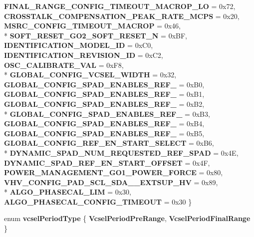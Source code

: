 \begin{DoxyCompactItemize}
{\bfseries F\+I\+N\+A\+L\+\_\+\+R\+A\+N\+G\+E\+\_\+\+C\+O\+N\+F\+I\+G\+\_\+\+T\+I\+M\+E\+O\+U\+T\+\_\+\+M\+A\+C\+R\+O\+P\+\_\+\+LO} = 0x72, 
{\bfseries C\+R\+O\+S\+S\+T\+A\+L\+K\+\_\+\+C\+O\+M\+P\+E\+N\+S\+A\+T\+I\+O\+N\+\_\+\+P\+E\+A\+K\+\_\+\+R\+A\+T\+E\+\_\+\+M\+C\+PS} = 0x20, 
{\bfseries M\+S\+R\+C\+\_\+\+C\+O\+N\+F\+I\+G\+\_\+\+T\+I\+M\+E\+O\+U\+T\+\_\+\+M\+A\+C\+R\+OP} = 0x46, 
\\*
{\bfseries S\+O\+F\+T\+\_\+\+R\+E\+S\+E\+T\+\_\+\+G\+O2\+\_\+\+S\+O\+F\+T\+\_\+\+R\+E\+S\+E\+T\+\_\+N} = 0x\+BF, 
{\bfseries I\+D\+E\+N\+T\+I\+F\+I\+C\+A\+T\+I\+O\+N\+\_\+\+M\+O\+D\+E\+L\+\_\+\+ID} = 0x\+C0, 
{\bfseries I\+D\+E\+N\+T\+I\+F\+I\+C\+A\+T\+I\+O\+N\+\_\+\+R\+E\+V\+I\+S\+I\+O\+N\+\_\+\+ID} = 0x\+C2, 
{\bfseries O\+S\+C\+\_\+\+C\+A\+L\+I\+B\+R\+A\+T\+E\+\_\+\+V\+AL} = 0x\+F8, 
\\*
{\bfseries G\+L\+O\+B\+A\+L\+\_\+\+C\+O\+N\+F\+I\+G\+\_\+\+V\+C\+S\+E\+L\+\_\+\+W\+I\+D\+TH} = 0x32, 
{\bfseries G\+L\+O\+B\+A\+L\+\_\+\+C\+O\+N\+F\+I\+G\+\_\+\+S\+P\+A\+D\+\_\+\+E\+N\+A\+B\+L\+E\+S\+\_\+\+R\+E\+F\+\_} = 0x\+B0, 
{\bfseries G\+L\+O\+B\+A\+L\+\_\+\+C\+O\+N\+F\+I\+G\+\_\+\+S\+P\+A\+D\+\_\+\+E\+N\+A\+B\+L\+E\+S\+\_\+\+R\+E\+F\+\_} = 0x\+B1, 
{\bfseries G\+L\+O\+B\+A\+L\+\_\+\+C\+O\+N\+F\+I\+G\+\_\+\+S\+P\+A\+D\+\_\+\+E\+N\+A\+B\+L\+E\+S\+\_\+\+R\+E\+F\+\_} = 0x\+B2, 
\\*
{\bfseries G\+L\+O\+B\+A\+L\+\_\+\+C\+O\+N\+F\+I\+G\+\_\+\+S\+P\+A\+D\+\_\+\+E\+N\+A\+B\+L\+E\+S\+\_\+\+R\+E\+F\+\_} = 0x\+B3, 
{\bfseries G\+L\+O\+B\+A\+L\+\_\+\+C\+O\+N\+F\+I\+G\+\_\+\+S\+P\+A\+D\+\_\+\+E\+N\+A\+B\+L\+E\+S\+\_\+\+R\+E\+F\+\_} = 0x\+B4, 
{\bfseries G\+L\+O\+B\+A\+L\+\_\+\+C\+O\+N\+F\+I\+G\+\_\+\+S\+P\+A\+D\+\_\+\+E\+N\+A\+B\+L\+E\+S\+\_\+\+R\+E\+F\+\_} = 0x\+B5, 
{\bfseries G\+L\+O\+B\+A\+L\+\_\+\+C\+O\+N\+F\+I\+G\+\_\+\+R\+E\+F\+\_\+\+E\+N\+\_\+\+S\+T\+A\+R\+T\+\_\+\+S\+E\+L\+E\+CT} = 0x\+B6, 
\\*
{\bfseries D\+Y\+N\+A\+M\+I\+C\+\_\+\+S\+P\+A\+D\+\_\+\+N\+U\+M\+\_\+\+R\+E\+Q\+U\+E\+S\+T\+E\+D\+\_\+\+R\+E\+F\+\_\+\+S\+P\+AD} = 0x4E, 
{\bfseries D\+Y\+N\+A\+M\+I\+C\+\_\+\+S\+P\+A\+D\+\_\+\+R\+E\+F\+\_\+\+E\+N\+\_\+\+S\+T\+A\+R\+T\+\_\+\+O\+F\+F\+S\+ET} = 0x4F, 
{\bfseries P\+O\+W\+E\+R\+\_\+\+M\+A\+N\+A\+G\+E\+M\+E\+N\+T\+\_\+\+G\+O1\+\_\+\+P\+O\+W\+E\+R\+\_\+\+F\+O\+R\+CE} = 0x80, 
{\bfseries V\+H\+V\+\_\+\+C\+O\+N\+F\+I\+G\+\_\+\+P\+A\+D\+\_\+\+S\+C\+L\+\_\+\+S\+D\+A\+\_\+\+\_\+\+E\+X\+T\+S\+U\+P\+\_\+\+HV} = 0x89, 
\\*
{\bfseries A\+L\+G\+O\+\_\+\+P\+H\+A\+S\+E\+C\+A\+L\+\_\+\+L\+IM} = 0x30, 
{\bfseries A\+L\+G\+O\+\_\+\+P\+H\+A\+S\+E\+C\+A\+L\+\_\+\+C\+O\+N\+F\+I\+G\+\_\+\+T\+I\+M\+E\+O\+UT} = 0x30
 \}\hypertarget{class_v_l53_l0_x_ae9d956d60961a009db8621edde00bfea}{}\label{class_v_l53_l0_x_ae9d956d60961a009db8621edde00bfea}

\item 
enum {\bfseries vcsel\+Period\+Type} \{ {\bfseries Vcsel\+Period\+Pre\+Range}, 
{\bfseries Vcsel\+Period\+Final\+Range}
 \}\hypertarget{class_v_l53_l0_x_a536b605b1242dd5355f49273450f8c83}{}\label{class_v_l53_l0_x_a536b605b1242dd5355f49273450f8c83}

\end{DoxyCompactItemize}
